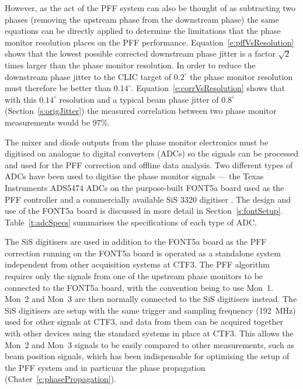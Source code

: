 However, as the act of the PFF system can also be thought of as subtracting two phases (removing the upstream phase from the downstream phase) the same equations can be directly applied to determine the limitations that the phase monitor resolution places on the PFF performance. Equation~\ref{e:pffVsResolution} shows that the lowest possible corrected downstream phase jitter is a factor \(\sqrt{2}\) times larger than the phase monitor resolution. In order to reduce the downstream phase jitter to the CLIC target of \(0.2^\circ\) the phase monitor resolution must therefore be better than \(0.14^\circ\). Equation~\ref{e:corrVsResolution} shows that with this \(0.14^\circ\) resolution and a typical beam phase jitter of \(0.8^\circ\) (Section~\ref{s:origJitter}) the measured correlation between two phase monitor measurements would be \(97\%\).


The mixer and diode outputs from the phase monitor electronics must be digitised on analogue to digital converters (ADCs) so the signals can be processed and used for the PFF correction and offline data analysis. Two different types of ADCs have been used to digitise the phase monitor signals --- the Texas Instruments ADS5474 ADCs \cite{fontADCs} on the purpose-built FONT5a board used as the PFF controller and a commercially available SiS 3320 digitiser \cite{sisDigi}. The design and use of the FONT5a board is discussed in more detail in Section~\ref{s:fontSetup}. Table~\ref{t:adcSpecs} summarises the specifications of each type of ADC. 

The SiS digitisers are used in addition to the FONT5a board as the PFF correction running on the FONT5a board is operated as a standalone system independent from other acquisition systems at CTF3. The PFF algorithm requires only the signals from one of the upstream phase monitors to be connected to the FONT5a board, with the convention being to use Mon~1. Mon~2 and Mon~3 are then normally connected to the SiS digitisers instead. The SiS digitisers are setup with the same trigger and sampling frequency (192~MHz) used for other signals at CTF3, and data from them can be acquired together with other devices using the standard systems in place at CTF3. This allows the Mon~2 and Mon~3 signals to be easily compared to other measurements, such as beam position signals, which has been indispensable for optimising the setup of the PFF system and in particuar the phase propagation (Chater~\ref{c:phasePropagation}).

